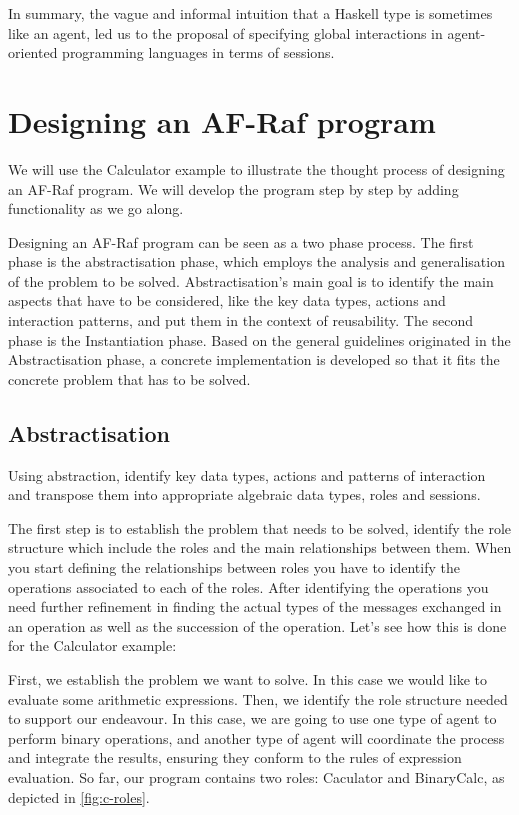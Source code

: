 \documentclass[a4paper,12pt,oneside,fleqn]{book} %
\newcommand{\todo}[1]{[\textcolor{red}{TODO}: #1]}
\begin{document}
{In summary, the vague and informal intuition that a Haskell type is
sometimes like an agent, led us to the proposal of specifying global
interactions in agent-oriented programming languages in terms of sessions.

\section{Designing an AF-Raf program} %
We will use the Calculator example to illustrate the thought process of
designing an AF-Raf program. We will develop the program step by step by
adding functionality as we go along.

Designing an AF-Raf program can be seen as a two phase process. The first
phase is the abstractisation phase, which employs the analysis and
generalisation of the problem to be solved. Abstractisation's main goal is to
identify the main aspects that have to be considered, like the key data
types, actions and interaction patterns, and put them in the context of
reusability. The second phase is the Instantiation phase. Based on the
general guidelines originated in the Abstractisation phase, a concrete
implementation is developed so that it fits the concrete problem that has
to be solved.
\subsection{Abstractisation} %
Using abstraction, identify key data types, actions and patterns of
interaction and transpose them into appropriate algebraic data types, roles
and sessions.

The first step is to establish the problem that needs to be solved, identify
the role structure which include the roles and the main relationships
between them. When you start defining the relationships between roles you
have to identify the operations associated to each of the roles. After
identifying the operations you need further refinement in finding the
actual types of the messages exchanged in an operation as well as the
succession of the operation. Let's see how this is done for the Calculator
example:

First, we establish the problem we want to solve. In this case we would
like to evaluate some arithmetic expressions. Then, we identify the role
structure needed to support our endeavour. In this case, we are going to
use one type of agent to perform binary operations, and another type of
agent will coordinate the process and integrate the results, ensuring they
conform to the rules of expression evaluation. So far, our program contains
two roles: Caculator and BinaryCalc, as depicted in \autoref{fig:c-roles}.

}
\end{document}
